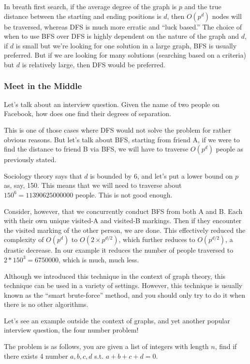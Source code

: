 \documentclass[12 pt, twoside] {article}
\begin{document}
{In breath first search, if the average degree of the graph is $p$ and the true
distance between the starting and ending positions is $d$, then $O(p^d)$ nodes
will be traversed, whereas DFS is much more erratic and ``luck based.'' The
choice of when to use BFS over DFS is highly dependent on the nature of the
graph and $d$, if $d$ is small but we're looking for one solution in a large
graph, BFS is usually preferred. But if we are looking for many solutions
(searching based on a criteria) but $d$ is relatively large, then DFS would be
preferred.

\subsubsection*{Meet in the Middle}

Let's talk about an interview question. Given the name of two people on
Facebook, how does one find their degrees of separation.

This is one of those cases where DFS would not solve the problem for rather
obvious reasons. But let's talk about BFS, starting from friend A, if we were to
find the distance to friend B via BFS, we will have to traverse $O(p^d)$ people
as previously stated.

Sociology theory says that $d$ is bounded by 6, and let's put a lower bound on
$p$ as, say, 150. This means that we will need to traverse about $150^6 =
11390625000000$ people. This is not good enough.

Consider, however, that we concurrently conduct BFS from both A and B. Each with
their own unique visited-A and visited-B markings. Then if they encounter the
visited marking of the other person, we are done. This effectively reduced the
complexity of $O(p^d)$ to $O(2 \times p^{d/2})$, which further reduces to
$O(p^{d/2})$, a drastic decrease. In our example it reduces the number of people
traversed to $2 * 150^3 = 6750000$, which is much, much less.

Although we introduced this technique in the context of graph theory, this
technique can be used in a variety of settings. However, this technique is
usually known as the ``smart brute-force'' method, and you should only try to do
it when there is no other algorithms.

Let's see an example outside the context of graphs, and yet another popular
interview question, the four number problem!

The problem is as follows, you are given a list of integers with length $n$,
find if there exists 4 number $a, b, c, d$ s.t. $a + b + c + d = 0$.

}
\end{document}

